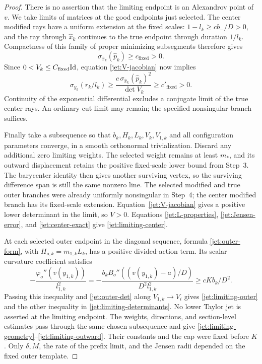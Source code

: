 \begin{proof}
There is no assertion that the limiting endpoint is an
Alexandrov point of $v$. We take limits of matrices at the good
endpoints just selected. The center modified rays have a uniform
extension at the fixed scales: $1-l_k\ge c b_-/D>0$, and the
ray through $\widehat x_k$ continues to the true endpoint through
duration $1/l_k$. Compactness of this family of proper minimizing
subsegments therefore gives
\[
 \sigma_{\widehat x_k}(\widehat p_k)\ge c_{\mathrm{fixed}}>0.
\]
Since $0<V_k\le C_{\mathrm{fixed}}\mathrm{Id}$, equation
\eqref{jet:V-jacobian} now implies
\[
 \sigma_{y_k}(r_k/l_k)
 \ge \frac{c\,\sigma_{\widehat x_k}(\widehat p_k)^2}
             {\det V_k}
 \ge c'_{\mathrm{fixed}}>0.
\]
Continuity of the exponential differential excludes a conjugate
limit of the true center rays. An ordinary cut limit may remain;
the specified nonsingular branch suffices.

Finally take a subsequence so that $b_k,H_k,L_k,V_k,V_{1,k}$
and all configuration parameters converge, in a smooth
orthonormal trivialization. Discard any additional zero
limiting weights. The selected weight remains at least $m_*$,
and its outward displacement retains the positive fixed-scale
lower bound from Step~3. The barycenter identity then gives
another surviving vertex, so the surviving difference span
is still the same nonzero line. The selected modified and true
outer branches were already uniformly nonsingular in
Step~4; the center modified branch has its fixed-scale
extension. Equation~\eqref{jet:V-jacobian} gives a positive
lower determinant in the limit, so $V>0$. Equations
\eqref{jet:L-properties}, \eqref{jet:Jensen-error}, and
\eqref{jet:center-exact} give
\eqref{jet:limiting-center}.

At each selected outer endpoint in the diagonal sequence, formula
\eqref{jet:outer-form}, with $H_{o,k}=m_{1,k}L_k$, has a positive
divided-action term. Its scalar curvature coefficient satisfies
\[
 -\frac{\varphi_o''(v(y_{1,k}))}{l_{1,k}^2}
 =-\frac{b_kB_o''((v(y_{1,k})-a)/D)}{D^2l_{1,k}^2}
 \ge cK b_k/D^2.
 \]
Passing this inequality and \eqref{jet:outer-det} along
$V_{1,k}\to V_i$ gives \eqref{jet:limiting-outer} and the other
inequality in \eqref{jet:limiting-determinants}. No lower Taylor
jet is asserted at the limiting endpoint. The weights, directions,
and section-level estimates pass through the same chosen
subsequence and give
\eqref{jet:limiting-geometry}--\eqref{jet:limiting-outward}.
Their constants and the cap were fixed before $K$.
Only $\delta,M$, the rate of the prefix limit, and the
Jensen radii depended on the fixed outer template.
\end{proof}

